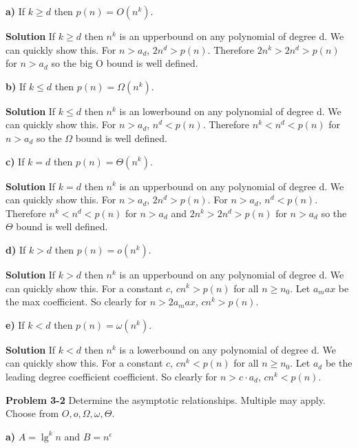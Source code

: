 \documentclass{article}
\begin{document}
\textbf{a)} If $k \geq d$ then $p(n) = O(n^k)$.

\medskip

\textbf{Solution} If $k \geq d$ then $n^k$ is an upperbound on any polynomial of degree d. We can quickly show this. For $n > a_d$, $2n^d > p(n)$. Therefore $2n^k > 2n^d > p(n)$ for $n > a_d$ so the big O bound is well defined.

\medskip

\textbf{b)} If $k \leq d$ then $p(n) = \Omega(n^k)$.

\medskip

\textbf{Solution} If $k \leq d$ then $n^k$ is an lowerbound on any polynomial of degree d. We can quickly show this. For $n > a_d$, $n^d < p(n)$. Therefore $n^k < n^d < p(n)$ for $n > a_d$ so the $\Omega$ bound is well defined.

\medskip

\textbf{c)} If $k = d$ then $p(n) = \Theta(n^k)$.

\medskip

\textbf{Solution} If $k = d$ then $n^k$ is an upperbound on any polynomial of degree d. We can quickly show this. For $n > a_d$, $2n^d > p(n)$. For $n > a_d$, $n^d < p(n)$. Therefore $n^k < n^d < p(n)$ for $n > a_d$ and $2n^k > 2n^d > p(n)$ for $n > a_d$ so the $\Theta$ bound is well defined.

\medskip

\textbf{d)} If $k > d$ then $p(n) = o(n^k)$.

\medskip

\textbf{Solution} If $k > d$ then $n^k$ is an upperbound on any polynomial of degree d. We can quickly show this. For a constant $c$, $cn^k > p(n)$ for all $n \geq n_0$. Let $a_max$ be the max coefficient. So clearly for $n > 2a_max$, $cn^k > p(n)$.

\medskip

\textbf{e)} If $k < d$ then $p(n) = \omega(n^k)$.

\medskip

\textbf{Solution} If $k < d$ then $n^k$ is a lowerbound on any polynomial of degree d. We can quickly show this. For a constant $c$, $cn^k < p(n)$ for all $n \geq n_0$. Let $a_d$ be the leading degree coefficient coefficient. So clearly for $n > c \cdot a_d$, $cn^k < p(n)$.

\medskip

\textbf{Problem 3-2} Determine the asymptotic relationships. Multiple may apply. Choose from $O, o, \Omega, \omega, \Theta$.

\textbf{a)} $A = \lg^k n$ and $B = n^\epsilon$
\end{document}
